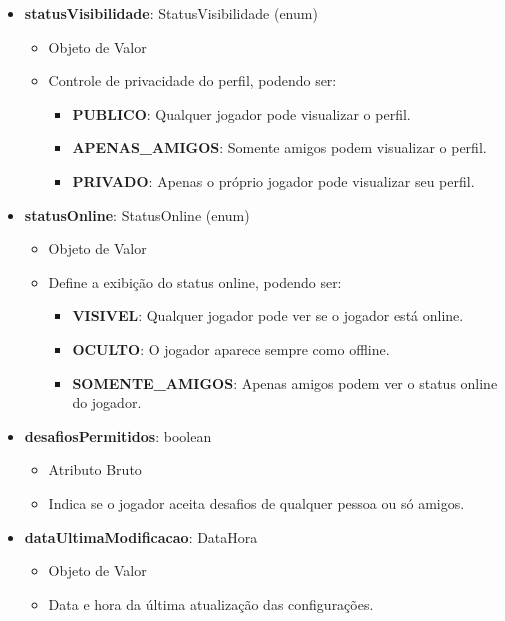 \begin{itemize}
        \item \textbf{statusVisibilidade}: StatusVisibilidade (enum)  
              \begin{itemize}
                  \item Objeto de Valor
                  \item Controle de privacidade do perfil, podendo ser:
                  \begin{itemize}
                      \item \textbf{PUBLICO}: Qualquer jogador pode visualizar o perfil.
                      \item \textbf{APENAS\_AMIGOS}: Somente amigos podem visualizar o perfil.
                      \item \textbf{PRIVADO}: Apenas o próprio jogador pode visualizar seu perfil.
                  \end{itemize}
              \end{itemize}
    
        \item \textbf{statusOnline}: StatusOnline (enum)  
              \begin{itemize}
                  \item Objeto de Valor
                  \item Define a exibição do status online, podendo ser:
                  \begin{itemize}
                      \item \textbf{VISIVEL}: Qualquer jogador pode ver se o jogador está online.
                      \item \textbf{OCULTO}: O jogador aparece sempre como offline.
                      \item \textbf{SOMENTE\_AMIGOS}: Apenas amigos podem ver o status online do jogador.
                  \end{itemize}
              \end{itemize}
    
        \item \textbf{desafiosPermitidos}: boolean  
              \begin{itemize}
                  \item Atributo Bruto
                  \item Indica se o jogador aceita desafios de qualquer pessoa ou só amigos.
              \end{itemize}
    
        \item \textbf{dataUltimaModificacao}: DataHora  
              \begin{itemize}
                  \item Objeto de Valor
                  \item Data e hora da última atualização das configurações.
              \end{itemize}
    \end{itemize}
                 

